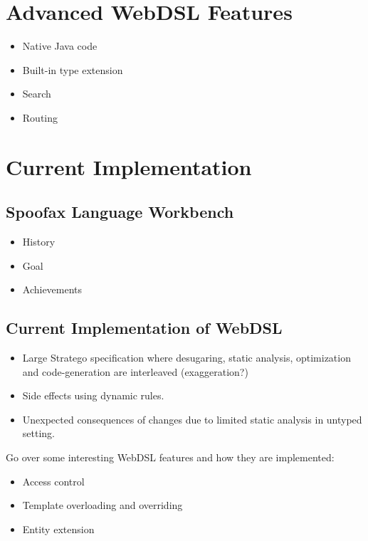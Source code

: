   \section{\label{sec:advanced-webdsl-features}Advanced WebDSL Features}

    \begin{itemize}
      \item Native Java code
      \item Built-in type extension
      \item Search
      \item Routing
    \end{itemize}

  \section{\label{sec:current-implementation}Current Implementation}

    \subsection{\label{subsec:spoofax}Spoofax Language Workbench}

      \begin{itemize}
        \item History
        \item Goal
        \item Achievements
      \end{itemize}

    \subsection{\label{subsec:current-implementation}Current Implementation of WebDSL}

      \begin{itemize}
        \item Large Stratego specification where desugaring, static analysis, optimization and code-generation are interleaved (exaggeration?)
        \item Side effects using dynamic rules.
        \item Unexpected consequences of changes due to limited static analysis in untyped setting.
      \end{itemize}

      Go over some interesting WebDSL features and how they are implemented:
      \begin{itemize}
        \item Access control
        \item Template overloading and overriding
        \item Entity extension
      \end{itemize}

